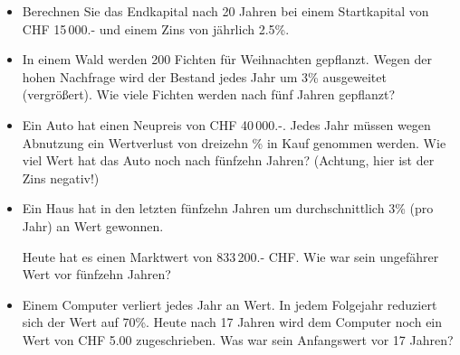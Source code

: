 \begin{itemize}
  \item Berechnen Sie das Endkapital nach 20 Jahren bei einem
  Startkapital von CHF 15\,000.- und einem Zins von jährlich
  2.5\%.\\%

\item In einem Wald werden 200 Fichten für Weihnachten
  gepflanzt. Wegen der hohen Nachfrage wird der Bestand jedes Jahr um
  3\% ausgeweitet (vergrößert).
  Wie viele Fichten werden nach fünf Jahren gepflanzt?




\item Ein Auto hat einen Neupreis von CHF 40\,000.-. Jedes Jahr müssen
wegen Abnutzung ein Wertverlust von dreizehn \% in Kauf
  genommen werden. Wie viel Wert hat das Auto noch nach fünfzehn Jahren? (Achtung, hier ist der Zins negativ!)


\newpage
\item Ein Haus hat in den letzten fünfzehn Jahren um durchschnittlich 3\% (pro Jahr) an Wert gewonnen.

Heute hat es einen Marktwert
  von 833\,200.- CHF. Wie  war sein ungefährer Wert vor fünfzehn Jahren?

\item Einem Computer verliert jedes Jahr an Wert. In jedem Folgejahr
reduziert sich der Wert auf 70\%. Heute nach 17 Jahren wird dem
Computer noch ein Wert von CHF 5.00 zugeschrieben. Was war sein
Anfangswert vor 17 Jahren?
\end{itemize}

\newpage

